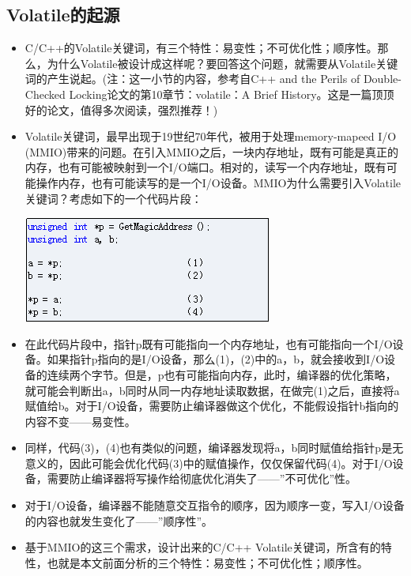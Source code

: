 \documentclass[9pt,b5paper]{article}
\begin{document}
\subsection{Volatile的起源}
\label{sec-8-5}
\begin{itemize}
\item C/C++的Volatile关键词，有三个特性：易变性；不可优化性；顺序性。那么，为什么Volatile被设计成这样呢？要回答这个问题，就需要从Volatile关键词的产生说起。(注：这一小节的内容，参考自C++ and the Perils of Double-Checked Locking论文的第10章节：volatile：A Brief History。这是一篇顶顶好的论文，值得多次阅读，强烈推荐！)
\item Volatile关键词，最早出现于19世纪70年代，被用于处理memory-mapeed I/O (MMIO)带来的问题。在引入MMIO之后，一块内存地址，既有可能是真正的内存，也有可能被映射到一个I/O端口。相对的，读写一个内存地址，既有可能操作内存，也有可能读写的是一个I/O设备。MMIO为什么需要引入Volatile关键词？考虑如下的一个代码片段：

\includegraphics[width=.9\linewidth]{../pic/v13.png}

\item 在此代码片段中，指针p既有可能指向一个内存地址，也有可能指向一个I/O设备。如果指针p指向的是I/O设备，那么(1)，(2)中的a，b，就会接收到I/O设备的连续两个字节。但是，p也有可能指向内存，此时，编译器的优化策略，就可能会判断出a，b同时从同一内存地址读取数据，在做完(1)之后，直接将a赋值给b。对于I/O设备，需要防止编译器做这个优化，不能假设指针b指向的内容不变——易变性。
\item 同样，代码(3)，(4)也有类似的问题，编译器发现将a，b同时赋值给指针p是无意义的，因此可能会优化代码(3)中的赋值操作，仅仅保留代码(4)。对于I/O设备，需要防止编译器将写操作给彻底优化消失了——”不可优化”性。
\item 对于I/O设备，编译器不能随意交互指令的顺序，因为顺序一变，写入I/O设备的内容也就发生变化了——”顺序性”。
\item 基于MMIO的这三个需求，设计出来的C/C++ Volatile关键词，所含有的特性，也就是本文前面分析的三个特性：易变性；不可优化性；顺序性。
\end{itemize}
\end{document}

